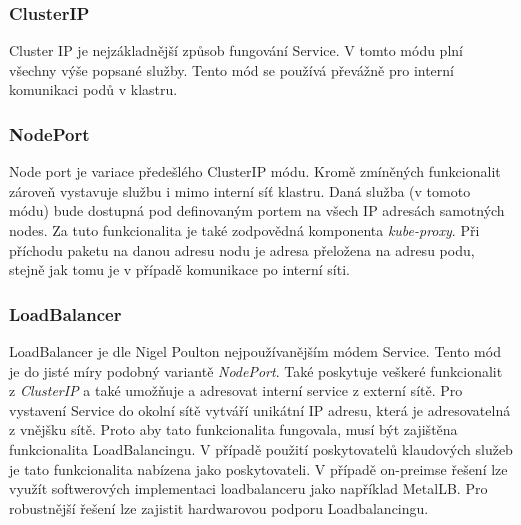 \subsubsection{ClusterIP}
Cluster IP je nejzákladnější způsob fungování Service. V tomto módu plní všechny výše popsané služby. Tento mód se používá převážně pro interní komunikaci podů v klastru. 
\subsubsection{NodePort}
Node port je variace předešlého ClusterIP módu. Kromě zmíněných funkcionalit zároveň vystavuje službu i mimo interní síť klastru. Daná služba (v tomoto módu) bude dostupná pod definovaným portem na všech IP adresách samotných nodes. Za tuto funkcionalita je také zodpovědná komponenta \textit{kube-proxy}. Při příchodu paketu na danou adresu nodu je adresa přeložena na adresu podu, stejně jak tomu je v případě komunikace po interní síti.   
\subsubsection{LoadBalancer}
LoadBalancer je dle Nigel Poulton\cite{poulton_2022_the} nejpoužívanějším módem Service. Tento mód je do jisté míry podobný variantě \textit{NodePort}. Také poskytuje veškeré funkcionalit z \textit{ClusterIP} a také umožňuje a adresovat interní service z externí sítě. Pro vystavení Service do okolní sítě vytváří unikátní IP adresu, která je adresovatelná z vnějšku sítě. Proto aby tato funkcionalita fungovala, musí být zajištěna funkcionalita LoadBalancingu. V případě použití poskytovatelů klaudových služeb je tato funkcionalita nabízena jako poskytovateli. V případě on-preimse řešení lze využít softwerových implementaci loadbalanceru jako například MetalLB. Pro robustnější řešení lze zajistit hardwarovou podporu Loadbalancingu. 


